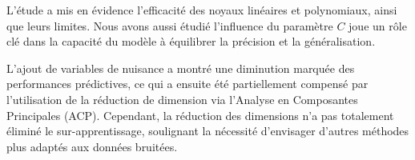 \documentclass{article}
\begin{document}
L'étude a mis en évidence l'efficacité des noyaux linéaires et polynomiaux, ainsi que leurs limites.
Nous avons aussi étudié l'influence du paramètre $C$ joue un rôle clé dans la capacité du modèle à équilibrer la précision et la généralisation.

L’ajout de variables de nuisance a montré une diminution marquée des performances prédictives, ce qui a ensuite été partiellement compensé par l’utilisation de la réduction de dimension via l'Analyse en Composantes Principales (ACP). Cependant, la réduction des dimensions n'a pas totalement éliminé le sur-apprentissage, soulignant la nécessité d’envisager d'autres méthodes plus adaptés aux données bruitées.
\end{document}
